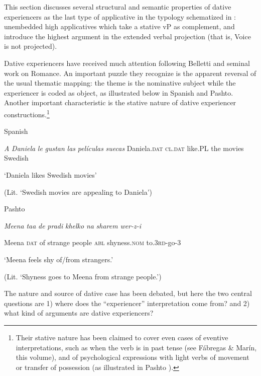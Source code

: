 \documentclass[output=paper,modfonts,nonflat]{langsci/langscibook}
\begin{document}
This section discusses several structural and semantic properties of dative experiencers as the last type of applicative in the typology schematized in : unembedded high applicatives which take a stative vP as complement, and introduce the highest argument in the extended verbal projection (that is, Voice is not projected). 

Dative experiencers have received much attention following Belletti and  seminal work on Romance. An important puzzle they  recognize is the apparent reversal of the usual thematic mapping: the theme is the nominative subject while the experiencer is coded as object, as illustrated below in Spanish and Pashto. Another important characteristic is the stative nature of dative experiencer constructions.\footnote{Their stative nature has been claimed to cover even cases of eventive interpretations, such as when the verb is in past tense (see Fábregas \& Marín, this volume), and of psychological expressions with light verbs of movement or transfer of possession (as illustrated in Pashto ).}

    Spanish 

  \textit{A} \textit{Daniela}    \textit{le}       \textit{gustan}  \textit{las} \textit{películas} \textit{suecas}      Daniela.\textsc{dat}   \textsc{cl.dat} like.PL  the movies Swedish

  ‘Daniela likes Swedish movies’ 

  (Lit. ‘Swedish movies are appealing to Daniela’)

   Pashto 

  \textit{Meena} \textit{taa}   \textit{de}  \textit{pradi}     \textit{khelko} \textit{na}   \textit{sharem}         \textit{wer-z-i}   

  Meena \textsc{dat} of   strange people \textsc{abl} shyness.\textsc{nom} to.3\textsc{rd}{}-go-3

  ‘Meena feels shy of/from strangers.’           \citep{Babrakzai1999}

  (Lit. ‘Shyness goes to Meena from strange people.’)      

The nature and source of dative case has been debated, but here the two central questions are 1) where does the “experiencer” interpretation come from? and 2) what kind of arguments are dative experiencers?
\end{document}
